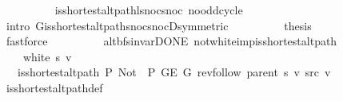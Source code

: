 \begin{isabellebody}
\ \ \ \ \ \ \ \ \isamarkupfalse%
\ is{\isacharunderscore}{\kern0pt}shortest{\isacharunderscore}{\kern0pt}alt{\isacharunderscore}{\kern0pt}path{\isacharunderscore}{\kern0pt}l{\isacharunderscore}{\kern0pt}snoc{\isacharunderscore}{\kern0pt}snoc\ no{\isacharunderscore}{\kern0pt}odd{\isacharunderscore}{\kern0pt}cycle\isanewline
\ \ \ \ \ \ \ \ \isamarkupfalse%
\ {\isacharparenleft}{\kern0pt}intro\ G{\isachardot}{\kern0pt}is{\isacharunderscore}{\kern0pt}shortest{\isacharunderscore}{\kern0pt}alt{\isacharunderscore}{\kern0pt}path{\isacharunderscore}{\kern0pt}snoc{\isacharunderscore}{\kern0pt}snocD{\isacharbrackleft}{\kern0pt}symmetric{\isacharbrackright}{\kern0pt}{\isacharparenright}{\kern0pt}\isanewline
\ \ \ \ \ \ \isamarkupfalse%
\ \isamarkupfalse%
\ {\isacharquery}{\kern0pt}thesis\isanewline
\ \ \ \ \ \ \ \ \isamarkupfalse%
\ fastforce\isanewline
\ \ \ \ \isamarkupfalse%
\isanewline
\ \ \isamarkupfalse%
\isanewline
{}\isamarkupfalse%
%
\endisatagproof
{\isafoldproof}%
%
\isadelimproof
\isanewline
%
\endisadelimproof
\isanewline
{}\isamarkupfalse%
\ {\isacharparenleft}{\kern0pt}\ alt{\isacharunderscore}{\kern0pt}bfs{\isacharunderscore}{\kern0pt}invar{\isacharunderscore}{\kern0pt}DONE{\isacharparenright}{\kern0pt}\ not{\isacharunderscore}{\kern0pt}white{\isacharunderscore}{\kern0pt}imp{\isacharunderscore}{\kern0pt}is{\isacharunderscore}{\kern0pt}shortest{\isacharunderscore}{\kern0pt}alt{\isacharunderscore}{\kern0pt}path{\isacharcolon}{\kern0pt}\isanewline
\ \ \ {\isachardoublequoteopen}{\isasymnot}\ white\ s\ v{\isachardoublequoteclose}\isanewline
\ \ \ {\isachardoublequoteopen}is{\isacharunderscore}{\kern0pt}shortest{\isacharunderscore}{\kern0pt}alt{\isacharunderscore}{\kern0pt}path\ P{\isacharprime}{\kern0pt}{\isacharprime}{\kern0pt}\ {\isacharparenleft}{\kern0pt}Not\ {\isasymcirc}\ P{\isacharprime}{\kern0pt}{\isacharprime}{\kern0pt}{\isacharparenright}{\kern0pt}\ {\isacharparenleft}{\kern0pt}G{\isachardot}{\kern0pt}E\ G{\isacharparenright}{\kern0pt}\ {\isacharparenleft}{\kern0pt}rev{\isacharunderscore}{\kern0pt}follow\ {\isacharparenleft}{\kern0pt}parent\ s{\isacharparenright}{\kern0pt}\ v{\isacharparenright}{\kern0pt}\ src\ v{\isachardoublequoteclose}\isanewline
%
\isadelimproof
\ \ %
\endisadelimproof
%
\isatagproof
{}\isamarkupfalse%
\ is{\isacharunderscore}{\kern0pt}shortest{\isacharunderscore}{\kern0pt}alt{\isacharunderscore}{\kern0pt}path{\isacharunderscore}{\kern0pt}def\isanewline

\end{isabellebody}
